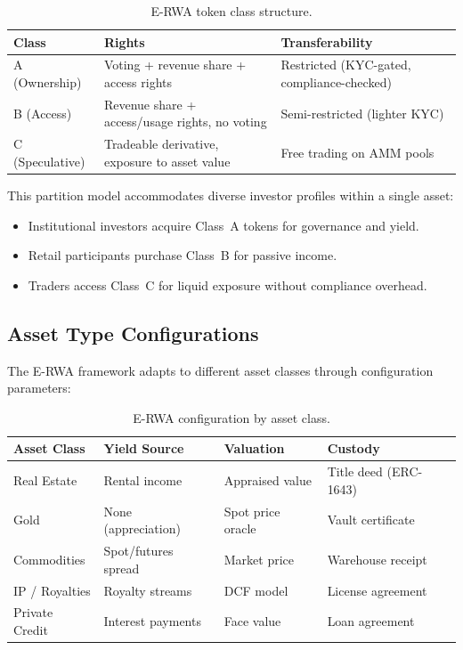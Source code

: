 \documentclass[11pt,a4paper]{article}
\begin{document}
\begin{table}[H]
\centering
\caption{E-RWA token class structure.}
\label{tab:token-classes}
\begin{tabularx}{\textwidth}{lXX}
\toprule
\textbf{Class} & \textbf{Rights} & \textbf{Transferability} \\
\midrule
A (Ownership) & Voting + revenue share + access rights & Restricted (KYC-gated, compliance-checked) \\
B (Access) & Revenue share + access/usage rights, no voting & Semi-restricted (lighter KYC) \\
C (Speculative) & Tradeable derivative, exposure to asset value & Free trading on AMM pools \\
\bottomrule
\end{tabularx}
\end{table}

This partition model accommodates diverse investor profiles within a single asset:
\begin{itemize}[nosep]
    \item Institutional investors acquire Class~A tokens for governance and yield.
    \item Retail participants purchase Class~B for passive income.
    \item Traders access Class~C for liquid exposure without compliance overhead.
\end{itemize}

\subsection{Asset Type Configurations}

The E-RWA framework adapts to different asset classes through configuration parameters:

\begin{table}[H]
\centering
\caption{E-RWA configuration by asset class.}
\label{tab:asset-configs}
\begin{tabularx}{\textwidth}{lXXX}
\toprule
\textbf{Asset Class} & \textbf{Yield Source} & \textbf{Valuation} & \textbf{Custody} \\
\midrule
Real Estate & Rental income & Appraised value & Title deed (ERC-1643) \\
Gold & None (appreciation) & Spot price oracle & Vault certificate \\
Commodities & Spot/futures spread & Market price & Warehouse receipt \\
IP / Royalties & Royalty streams & DCF model & License agreement \\
Private Credit & Interest payments & Face value & Loan agreement \\
\bottomrule
\end{tabularx}
\end{table}
\end{document}
